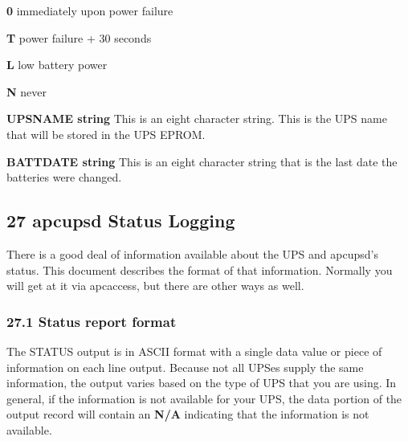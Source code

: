 \begin{description}
\begin{description}

\item {\bf 0}
immediately upon power failure  

\item {\bf T}
power failure + 30 seconds  

\item {\bf L}
low battery power  

\item {\bf N}
never 
\end{description}


\item {\bf UPSNAME \lt{}string\gt{}}
This is an eight character string. This is the UPS name that will be stored in
the UPS EPROM.  

\item {\bf BATTDATE \lt{}string\gt{}}
This is an eight character string that is the last date the batteries were
changed. 
\end{description}

\label{apcupsd-Status-Logging}

\subsection*{27 apcupsd Status Logging}

\label{index-Logging_002c-Status-250}
\label{index-Status-logging-251}
There is a good deal of information available about the UPS and apcupsd's
status. This document describes the format of that information.  Normally you
will get at it via apcaccess, but there are other ways as well. 

\label{Status-report-format}

\subsubsection*{27.1 Status report format}

\label{index-Status-Report-252}
\label{index-Report_002c-Status-253}
The STATUS output is in ASCII format with a single data value or piece of
information on each line output. Because not all UPSes supply the same
information, the output varies based on the type of UPS that you are using. In
general, if the information is not available for your UPS, the data portion of
the output record will contain an {\bf N/A} indicating that the information is
not available.  

